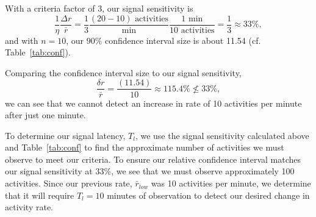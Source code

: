 \documentclass{article}
\begin{document}
With a criteria factor of 3, our signal sensitivity is
\begin{equation}
\label{eq:ex2:latency}
\frac{1}{\eta} \frac{\Delta r}{\bar{r}} = 	
	\frac{1}{3} 
	\frac{(20-10) \text{ activities}}{\text{min}} 
	\frac{1 \text{ min}}{10 \text{ activities}} = \frac{1}{3} \approx 33\%,
\end{equation}
and with $n = 10$, our $90\%$ confidence interval size is about 11.54 (cf. Table~\ref{tab:conf}). 

Comparing the confidence interval size to our signal sensitivity,
\begin{equation}
    \label{eq:ex2:notmet}
    \frac{\delta r}{\bar{r}} = \frac{(11.54)}{10} \approx 115.4\% \not\le 33\%, 
\end{equation}
we can see that we cannot detect an increase in rate of 10 activities per minute after just one 
minute.

To determine our signal latency, $T_l$, we use the signal sensitivity calculated above and 
Table~\ref{tab:conf} to find the approximate number of activities we must observe to meet our 
criteria. To ensure our relative confidence interval matches our signal sensitivity at $33\%$, we 
see that we must observe approximately 100 activities. Since our previous rate, $\bar{r}_{low}$ 
was 10 activities per minute, we determine that it will require $T_l = 10$ minutes of 
observation to detect our desired change in activity rate.
\end{document}
